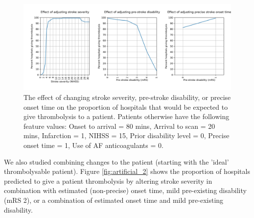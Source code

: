 \begin{figure}
\centering
\includegraphics[width=1\textwidth]{./images/20_synthetic_xgb_10_features_IVT_rate_vs_feature_values}
\caption{The effect of changing stroke severity, pre-stroke disability, or precise onset time on the proportion of hospitals that would be expected to give thrombolysis to a patient. Patients otherwise have the following feature values: Onset to arrival = 80 mins, Arrival to scan = 20 mins, Infarction = 1, NIHSS = 15, Prior disability level = 0, Precise onset time = 1, Use of AF anticoagulants = 0.}
\label{fig:artificial_1}
\end{figure}

We also studied combining changes to the patient (starting with the 'ideal' thrombolysable patient). Figure \ref{fig:artificial_2} shows the proportion of hospitals predicted to give a patient thrombolysis by altering stroke severity in combination with estimated (non-precise) onset time, mild pre-existing disability (mRS 2), or a combination of estimated onset time and mild pre-existing disability.

